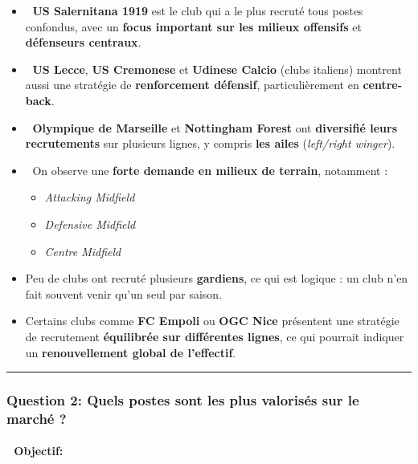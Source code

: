 \documentclass[
]{article}
\providecommand{\tightlist}{%
  \setlength{\itemsep}{0pt}\setlength{\parskip}{0pt}}
\begin{document}
\begin{itemize}
\item
  🔵 \textbf{US Salernitana 1919} est le club qui a le plus recruté tous
  postes confondus, avec un \textbf{focus important sur les milieux
  offensifs} et \textbf{défenseurs centraux}.
\item
  🔵 \textbf{US Lecce}, \textbf{US Cremonese} et \textbf{Udinese Calcio}
  (clubs italiens) montrent aussi une stratégie de \textbf{renforcement
  défensif}, particulièrement en \textbf{centre-back}.
\item
  🔵 \textbf{Olympique de Marseille} et \textbf{Nottingham Forest} ont
  \textbf{diversifié leurs recrutements} sur plusieurs lignes, y compris
  \textbf{les ailes} (\emph{left/right winger}).
\item
  🎯 On observe une \textbf{forte demande en milieux de terrain},
  notamment :

  \begin{itemize}
  \tightlist
  \item
    \emph{Attacking Midfield}
  \item
    \emph{Defensive Midfield}
  \item
    \emph{Centre Midfield}
  \end{itemize}
\item
  Peu de clubs ont recruté plusieurs \textbf{gardiens}, ce qui est
  logique : un club n'en fait souvent venir qu'un seul par saison.
\item
  Certains clubs comme \textbf{FC Empoli} ou \textbf{OGC Nice}
  présentent une stratégie de recrutement \textbf{équilibrée sur
  différentes lignes}, ce qui pourrait indiquer un
  \textbf{renouvellement global de l'effectif}.
\end{itemize}

\begin{center}\rule{0.5\linewidth}{0.5pt}\end{center}

\subsubsection{\texorpdfstring{\textbf{Question 2:} Quels postes sont
les plus valorisés sur le marché
?}{Question 2: Quels postes sont les plus valorisés sur le marché ?}}\label{question-2-quels-postes-sont-les-plus-valorisuxe9s-sur-le-marchuxe9}

\paragraph{🎯 Objectif:}\label{objectif-1}
\end{document}
